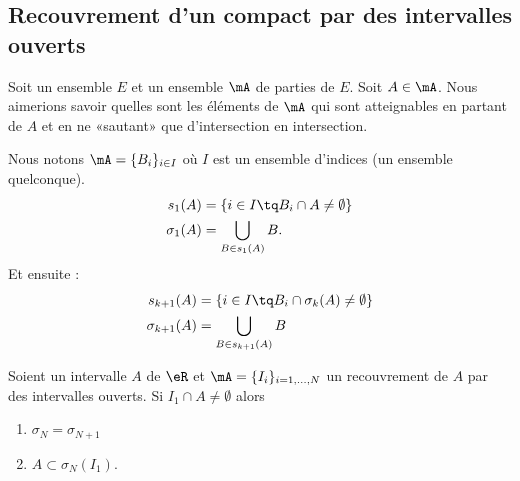 \subsection{Recouvrement d'un compact par des intervalles ouverts}

Soit un ensemble \( E\) et un ensemble \( \mA\) de parties de \( E\). Soit \( A\in \mA\). Nous aimerions savoir quelles sont les éléments de \( \mA\) qui sont atteignables en partant de \( A\) et en ne «sautant» que d'intersection en intersection.

Nous notons \( \mA=\{ B_i \}_{i\in I}\) où \( I\) est un ensemble d'indices (un ensemble quelconque).
\begin{subequations}
    \begin{align}
        s_1(A)&=\{  i\in I\tq B_i\cap A\neq \emptyset   \}\\
        \sigma_1(A)&=\bigcup_{B\in s_1(A)}B.
    \end{align}
\end{subequations}
Et ensuite :
\begin{subequations}
    \begin{align}
        s_{k+1}(A)&=\{ i\in I\tq B_i\cap \sigma_k(A)\neq \emptyset \}\\
        \sigma_{k+1}(A)&=\bigcup_{B\in s_{k+1}(A)}B
    \end{align}
\end{subequations}

\begin{lemma}
    Soient un intervalle \( A\) de \( \eR\) et \( \mA=\{ I_i \}_{i=1,\ldots, N}\) un recouvrement de \( A\) par des intervalles ouverts. Si \( I_1\cap A\neq \emptyset\) alors
    \begin{enumerate}
        \item
            \( \sigma_{N}=\sigma_{N+1}\)
        \item
            \( A\subset \sigma_N(I_1)\).
    \end{enumerate}
\end{lemma}

